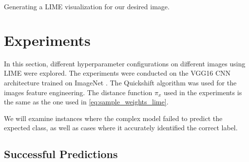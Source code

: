 Generating a LIME visualization for our desired image.

\newpage
\section{Experiments} 

In this section, different hyperparameter configurations on different images using LIME were explored.
The experiments were conducted on the VGG16 CNN architecture trained on ImageNet \citep{russakovsky2015imagenetlargescalevisual}. 
The Quickshift algorithm was used for the images feature engineering. 
The distance function \(\pi_x\) used in the experiments is the same as the one used in \ref{eq:sample_weights_lime}.

We will examine instances where the complex model failed to predict the expected class, as well as cases where it accurately identified the correct label.

\subsection{Successful Predictions}

